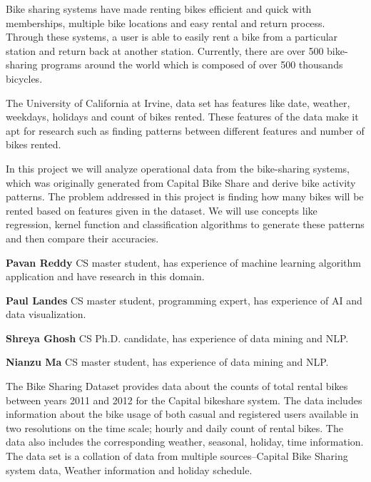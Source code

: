 \documentclass[12pt]{article}
\author{\theauthor}
\newcommand{\ci}[1]{\cite{#1}}
\begin{document}
\maketitle



Bike sharing systems have made renting bikes efficient and quick with
memberships, multiple bike locations and easy rental and return
process. Through these systems, a user is able to easily rent a bike from a
particular station and return back at another station. Currently, there are
over 500 bike-sharing programs around the world which is composed of over 500
thousands bicycles\ci{ucibikeshare}.


The University of California at Irvine, data set has features like date,
weather, weekdays, holidays and count of bikes rented. These features of the
data make it apt for research such as finding patterns between different
features and number of bikes rented.

In this project we will analyze operational data from the bike-sharing systems,
which was originally generated from Capital Bike Share and derive bike activity
patterns. The problem addressed in this project is finding how many bikes will
be rented based on features given in the dataset. We will use concepts like
regression, kernel function and classification algorithms to generate these
patterns and then compare their accuracies.

{\bf Pavan Reddy} CS master student, has experience of machine learning
algorithm application and have research in this domain.

\noindent
{\bf Paul Landes} CS master student, programming expert, has experience of AI
and data visualization.

\noindent
{\bf Shreya Ghosh} CS Ph.D. candidate, has experience of data mining and NLP.

\noindent
{\bf Nianzu Ma} CS master student, has experience of data mining and NLP.



The Bike Sharing Dataset provides data about the counts of total rental bikes
between years 2011 and 2012 for the Capital bikeshare system. The data includes
information about the bike usage of both casual and registered users available
in two resolutions on the time scale; hourly and daily count of rental
bikes. The data also includes the corresponding weather, seasonal, holiday,
time information. The data set is a collation of data from multiple
sources--Capital Bike Sharing system data\ci{capbikeshare}, Weather
information\ci{freemeteo} and holiday schedule\ci{holiday}.
\end{document}
